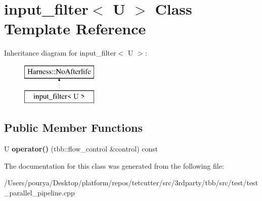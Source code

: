 \hypertarget{classinput__filter}{}\section{input\+\_\+filter$<$ U $>$ Class Template Reference}
\label{classinput__filter}
Inheritance diagram for input\+\_\+filter$<$ U $>$\+:\begin{figure}[H]
\begin{center}
\leavevmode
\includegraphics[height=2.000000cm]{classinput__filter}
\end{center}
\end{figure}
\subsection*{Public Member Functions}
\begin{DoxyCompactItemize}
\item 
\hypertarget{classinput__filter_a7364df0237513c4b7381c6a3ded565ab}{}U {\bfseries operator()} (tbb\+::flow\+\_\+control \&control) const \label{classinput__filter_a7364df0237513c4b7381c6a3ded565ab}

\end{DoxyCompactItemize}


The documentation for this class was generated from the following file\+:\begin{DoxyCompactItemize}
\item 
/\+Users/pourya/\+Desktop/platform/repos/tetcutter/src/3rdparty/tbb/src/test/test\+\_\+parallel\+\_\+pipeline.\+cpp\end{DoxyCompactItemize}
